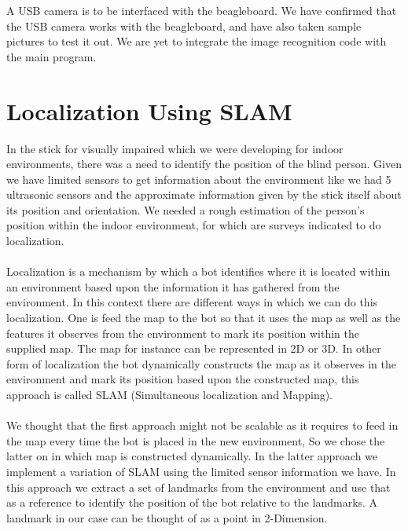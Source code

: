 \documentclass[12pt]{article}
\begin{document}
A USB camera is to be interfaced with the beagleboard. We have confirmed that the USB camera works with the beagleboard, and have also taken sample pictures to test it out. We are yet to integrate the image recognition code with the main program.
\section{Localization Using SLAM}
In the stick for visually impaired which we were developing for indoor environments, there was a need to identify the position of the blind person\cite{slam}. Given we have limited sensors to get information about the environment like we had 5 ultrasonic sensors and the approximate information given by the stick itself about its position and orientation. We needed a rough estimation of the person's position within the indoor environment, for which are surveys indicated to do localization.\\
\\
Localization is a mechanism by which a bot identifies where it is located within an environment based upon the information it has gathered from the environment. In this context there are different ways in which we can do this localization. One is feed the map to the bot so that it uses the map as well as the features it observes from the environment to mark its position within the supplied map\cite{slamm}. The map for instance can be represented in 2D or 3D. In other form of localization the bot dynamically constructs the map as it observes in the environment and mark its position based upon the constructed map, this approach is called SLAM (Simultaneous localization and Mapping).\\
\\
We thought that the first approach might not be scalable as it requires to feed in the map every time the bot is placed in the new environment, So we chose the latter on in which map is constructed dynamically. In the latter approach we implement a variation of SLAM using the limited sensor information we have. In this approach we extract a set of landmarks\cite{landmark} from the environment and use that as a reference to identify the position of the bot relative to the landmarks. A landmark in our case can be thought of as a point in 2-Dimension.\\
\\
\end{document}

